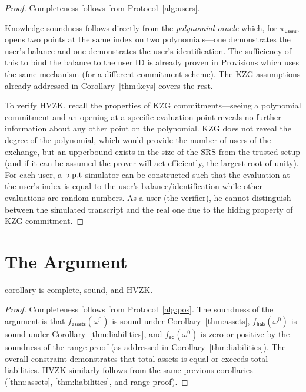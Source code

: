 \begin{proof}
Completeness follows from Protocol~\ref{alg:users}. 

Knowledge soundness follows directly from the \textit{polynomial oracle} which, for $\pi_\mathsf{users}$, opens two points at the same index on two polynomials---one demonstrates the user's balance and one demonstrates the user's identification. The sufficiency of this to bind the balance to the user ID is already proven in Provisions which uses the same mechanism (for a different commitment scheme). The KZG assumptions already addressed in Corollary~\ref{thm:keys} covers the rest. 

To verify HVZK, recall the properties of KZG commitments---seeing a polynomial commitment and an opening at a specific evaluation point reveals no further information about any other point on the polynomial. KZG does not reveal the degree of the polynomial, which would provide the number of users of the exchange, but an upperbound exists in the size of the SRS from the trusted setup (and if it can be assumed the prover will act efficiently, the largest root of unity). For each user, a $\text{p.p.t}$ simulator can be constructed such that the evaluation at the user's index is equal to the user's balance/identification while other evaluations are random numbers. As a user (the verifier), he cannot distinguish between the simulated transcript and the real one due to the hiding property of KZG commitment. 
\end{proof}


\section{The \pos Argument}

\begin{restatable}{corollary}{}
\label{thm:solvency} 
\pos is complete, sound, and HVZK. 
\end{restatable}

\begin{proof}
Completeness follows from Protocol~\ref{alg:pos}. The soundness of the argument is that $f_\mathsf{assets}(\omega^0)$ is sound under Corollary~\ref{thm:assets}, $f_\mathsf{liab}(\omega^0)$ is sound under Corollary~\ref{thm:liabilities}, and $f_\mathsf{eq}(\omega^0)$ is zero or positive by the soundness of the range proof (as addressed in Corollary~\ref{thm:liabilities}). The overall constraint demonstrates that total assets is equal or exceeds total liabilities. HVZK similarly follows from the same previous corollaries (\ref{thm:assets}, \ref{thm:liabilities}, and range proof).
\end{proof}

